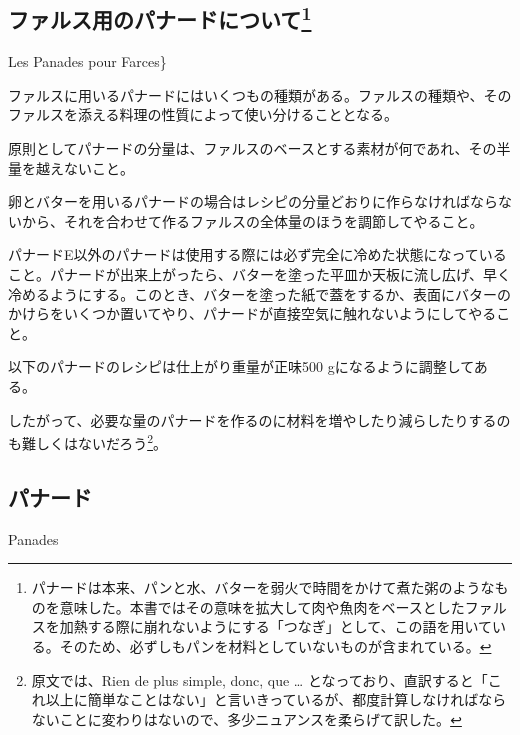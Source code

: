 \begin{main}
\hypertarget{les-panades-pour-farces}{%
\subsection[ファルス用のパナードについて]{\texorpdfstring{ファルス用のパナードについて\footnote{パナードは本来、パンと水、バターを弱火で時間をかけて煮た粥のようなものを意味した。本書ではその意味を拡大して肉や魚肉をベースとしたファルスを加熱する際に崩れないようにする「つなぎ」として、この語を用いている。そのため、必ずしもパンを材料としていないものが含まれている。}}{ファルス用のパナードについて}}\label{les-panades-pour-farces}}

\begin{frsecbenv}

Les Panades pour Farces\}

\end{frsecbenv}


ファルスに用いるパナードにはいくつもの種類がある。ファルスの種類や、そのファルスを添える料理の性質によって使い分けることとなる。

原則としてパナードの分量は、ファルスのベースとする素材が何であれ、その半量を越えないこと。

卵とバターを用いるパナードの場合はレシピの分量どおりに作らなければならないから、それを合わせて作るファルスの全体量のほうを調節してやること。

パナードE以外のパナードは使用する際には必ず完全に冷めた状態になっていること。パナードが出来上がったら、バターを塗った平皿か天板に流し広げ、早く冷めるようにする。このとき、バターを塗った紙で蓋をするか、表面にバターのかけらをいくつか置いてやり、パナードが直接空気に触れないようにしてやること。

以下のパナードのレシピは仕上がり重量が正味500
gになるように調整してある。

したがって、必要な量のパナードを作るのに材料を増やしたり減らしたりするのも難しくはないだろう\footnote{原文では、Rien
  de plus simple, donc, que \ldots{}
  となっており、直訳すると「これ以上に簡単なことはない」と言いきっているが、都度計算しなければならないことに変わりはないので、多少ニュアンスを柔らげて訳した。}。

\hypertarget{panades}{%
\subsection{パナード}\label{panades}}

\begin{frsecbenv}

Panades

\end{frsecbenv}

 

\end{main}

